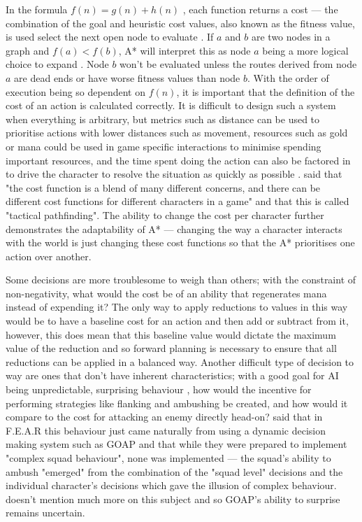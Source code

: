 \documentclass[11pt, a4paper]{report}
\begin{document}
In the formula $f(n) = g(n) + h(n)$ \parencite{hart1968formal}, each function returns a cost --- the combination of the goal and heuristic cost values, also known as the fitness value, is used select the next open node to evaluate \parencite[94]{russell2016artificial}. If $a$ and $b$ are two nodes in a graph and $f(a) < f(b)$, A* will interpret this as node $a$ being a more logical choice to expand \parencite[7]{orkin2003applying}. Node $b$ won't be evaluated unless the routes derived from node $a$ are dead ends or have worse fitness values than node $b$. With the order of execution being so dependent on $f(n)$, it is important that the definition of the cost of an action is calculated correctly. It is difficult to design such a system when everything is arbitrary, but metrics such as distance can be used to prioritise actions with lower distances such as movement, resources such as gold or mana could be used in game specific interactions to minimise spending important resources, and the time spent doing the action can also be factored in to drive the character to resolve the situation as quickly as possible \parencite[8]{lester2005pathfinding}. \citeauthor{millington2019ai} \parencite*{millington2019ai} said that "the cost function is a blend of many different concerns, and there can be different cost functions for different characters in a game" and that this is called "tactical pathfinding". The ability to change the cost per character further demonstrates the adaptability of A* --- changing the way a character interacts with the world is just changing these cost functions so that the A* prioritises one action over another.

Some decisions are more troublesome to weigh than others; with the constraint of non-negativity, what would the cost be of an ability that regenerates mana instead of expending it? The only way to apply reductions to values in this way would be to have a baseline cost for an action and then add or subtract from it, however, this does mean that this baseline value would dictate the maximum value of the reduction and so forward planning is necessary to ensure that all reductions can be applied in a balanced way. Another difficult type of decision to way are ones that don't have inherent characteristics; with a good goal for AI being unpredictable, surprising behaviour \parencite[17]{scott2002illusion}, how would the incentive for performing strategies like flanking and ambushing be created, and how would it compare to the cost for attacking an enemy directly head-on? \citeauthor{orkin2006three} \parencite*[14]{orkin2006three} said that in F.E.A.R \parencite{FEAR} this behaviour just came naturally from using a dynamic decision making system such as GOAP and that while they were prepared to implement "complex squad behaviour", none was implemented --- the squad's ability to ambush "emerged" from the combination of the "squad level" decisions and the individual character's decisions which gave the illusion of complex behaviour. \citeauthor{orkin2006three} doesn't mention much more on this subject and so GOAP's ability to surprise remains uncertain.
\end{document}
